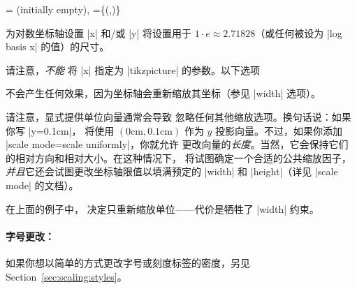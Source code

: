 \begin{pgfplotsxykeylist}{%
    \x= (initially empty),
    \x={\{(,)\}}%
}
\begin{codeexample}[]
\end{codeexample}

    为对数坐标轴设置 |x| 和/或 |y| 将设置用于 $1 \cdot e \approx 2.71828$（或任何被设为 |log basis x| 的值）的尺寸。

    请注意，\emph{不能} 将 |x| 指定为 |tikzpicture| 的参数。以下选项
\begin{codeexample}
\end{codeexample}
    不会产生任何效果，因为坐标轴会重新缩放其坐标（参见 |width| 选项）。

    请注意，显式提供单位向量通常会导致 \PGFPlots{} 忽略任何其他缩放选项。换句话说：如果你写 |y=0.1cm|，\PGFPlots{} 将使用 $(0\text{cm},0.1\text{cm})$ 作为 $y$ 投影向量。不过，如果你添加 |scale mode=scale uniformly|，你就允许 \PGFPlots{} 更改向量的\emph{长度}。当然，它会保持它们的相对方向和相对大小。在这种情况下，\PGFPlots{} 将试图确定一个合适的公共缩放因子，\emph{并且}它还会试图更改坐标轴限值以填满预定的 |width| 和 |height|（详见 |scale mode| 的文档）。
\begin{codeexample}[]
\end{codeexample}
    \noindent 在上面的例子中，\PGFPlots{} 决定只重新缩放单位——代价是牺牲了 |width| 约束。


    \paragraph{字号更改：}

    如果你想以简单的方式更改字号或刻度标签的密度，另见 Section~\ref{sec:scaling:styles}。



\end{pgfplotsxykeylist}

